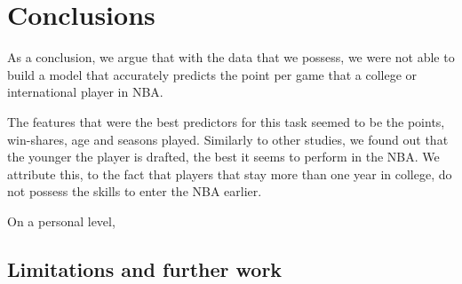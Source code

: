
\section{Conclusions}%
\label{sec:conclusions}


As a conclusion, we argue that with the data that we possess, we were not able to build a model that accurately predicts the point per game that a college or international player in NBA.

The features that were the best predictors for this task seemed to be the points, win-shares, age and seasons played. Similarly to other studies, we found out that the younger the player is drafted, the best it seems to perform in the NBA. We attribute this, to the fact that players that stay more than one year in college, do not possess the skills to enter the NBA earlier.

On a personal level, 

\subsection{Limitations and further work}%
\label{sub:limitations}
